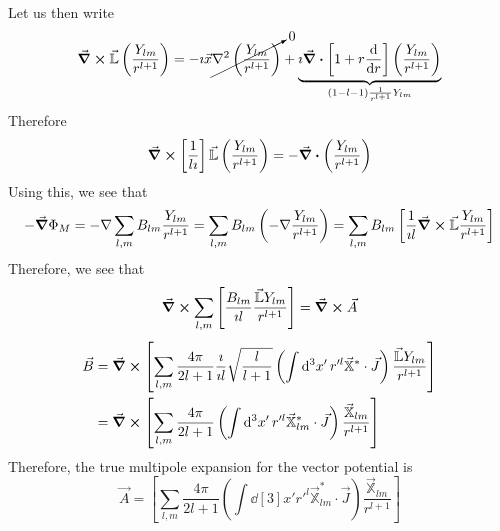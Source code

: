 \documentclass[a4paper,twoside,master.tex]{subfiles}
\begin{document}
Let us then write
\begin{equation}
    \curl{ \vec{\mathbb{L}}} \left( \frac{Y_{lm}}{r^{l+1}} \right) = -\imath \vec{x} \cancelto{0}{\laplacian{\left( \frac{Y_{lm}}{r^{l+1}} \right)}} + \underbrace{\imath \div{\left[ 1+ r \dv{r} \right] \left( \frac{Y_{lm}}{r^{l+1}} \right)}}_{(1-l-1) \frac{1}{r^{l+1}} Y_{lm}}
\end{equation}
Therefore
\begin{equation}
    \curl{\left[ \frac{1}{l\imath} \right] \vec{\mathbb{L}} \left( \frac{Y_{lm}}{r^{l+1}} \right)} = - \div{\left( \frac{Y_{lm}}{r^{l+1}} \right)}
\end{equation}
Using this, we see that
\begin{equation}
    - \grad{\Phi_M} = - \nabla \sum_{l,m} B_{lm} \frac{Y_{lm}}{r^{l+1}} = \sum_{l,m} B_{lm}\left( -\nabla \frac{Y_{lm}}{r^{l+1}} \right) = \sum_{l,m} B_{lm}\left[ \frac{1}{\imath l} \curl{ \vec{\mathbb{L}}} \frac{Y_{lm}}{r^{l+1}}  \right]
\end{equation}
Therefore, we see that
\begin{equation}
    \curl{\sum_{l,m} \left[ \frac{B_{lm}}{\imath l} \frac{ \vec{\mathbb{L}} Y_{lm}}{r^{l+1}} \right]} = \curl{ \vec{A}}
\end{equation}
\begin{align}
    \vec{B} &= \curl{\left[ \sum_{l,m} \frac{4 \pi}{2l + 1} \frac{\imath}{\imath l} \sqrt{\frac{l}{l+1}} \left( \int \dd[3]{x'} r'^l \vec{\mathbb{X}}^* \cdot \vec{J} \right) \frac{ \vec{\mathbb{L}} Y_{lm}}{r^{l+1}} \right]}\\
    &= \curl{\left[ \sum_{l,m} \frac{4 \pi}{2l+1} \left( \int \dd[3]{x'} r'^l \vec{\mathbb{X}}^*_{lm} \cdot \vec{J} \right) \frac{ \vec{\mathbb{X}}_{lm}}{r^{l+1}} \right]}
\end{align}
Therefore, the true multipole expansion for the vector potential is
\begin{equation}
    \vec{A} = \left[ \sum_{l,m} \frac{4 \pi}{2l+1} \left( \int \dd[3]{x'} r'^l \vec{\mathbb{X}}^*_{lm} \cdot \vec{J} \right) \frac{ \vec{\mathbb{X}}_{lm}}{r^{l+1}} \right]
\end{equation}
\end{document}
